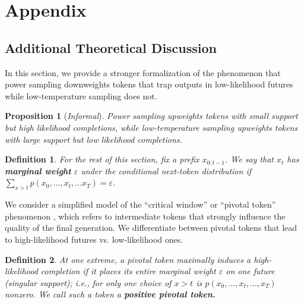 \documentclass{article}
\newtheorem{proposition}{Proposition}
\newtheorem{definition}{Definition}
\begin{document}
% 


{
    
    
}

% 
% 


\newpage


\appendix
\section{Appendix}

\subsection{Additional Theoretical Discussion}\label{apx:proof}

In this section, we provide a stronger formalization of the phenomenon that power sampling downweights tokens that trap outputs in low-likelihood futures while low-temperature sampling does not. 

\begin{proposition}[\textit{Informal}]
    Power sampling upweights tokens with small support but high likelihood completions, while low-temperature sampling upweights tokens with large support but low likelihood completions.
\end{proposition}


\begin{definition}
    \rm For the rest of this section, fix a prefix $x_{0:t-1}$. We say that $x_t$ has \textbf{marginal weight} $\varepsilon$ under the conditional next-token distribution if $\sum_{x>t}p(x_0, \dots, x_t, \dots x_T) = \varepsilon$.
\end{definition}

We consider a simplified model of the ``critical window'' or ``pivotal token'' phenomenon \citep{li2025blinkofaneyetheory, abdin2024phi4}, which refers to intermediate tokens that strongly influence the quality of the final generation. We differentiate between pivotal tokens that lead to high-likelihood futures vs. low-likelihood ones. 

\begin{definition}
\rm
    At one extreme, a pivotal token maximally induces a high-likelihood completion if it places its entire marginal weight $\varepsilon$ on one future (singular support); i.e., for only one choice of $x>t$ is $p(x_0, \dots, x_t, \dots, x_T)$ nonzero. We call such a token a \textbf{positive pivotal token.}
\end{definition}
\end{document}
